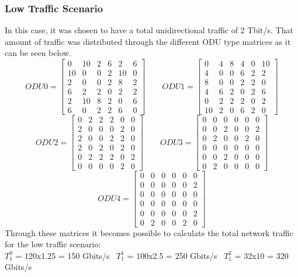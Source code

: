 \subsubsection{Low Traffic Scenario}
\label{low}

In this case, it was chosen to have a total unidirectional traffic of 2 Tbit/s. That amount of traffic was distributed through the different ODU type matrices as it can be seen below. 
\[
ODU0=
  \begin{bmatrix}
    0 & 10 & 2 & 6 & 2 & 6 \\
    10 & 0 & 0 & 2 & 10 & 0 \\
    2 & 0 & 0 & 2 & 8 & 2 \\
    6 & 2 & 2 & 0 & 2 & 2 \\
    2 & 10 & 8 & 2 & 0 & 6 \\
    6 & 0 & 2 & 2 & 6 & 0
  \end{bmatrix}
\qquad ODU1=
  \begin{bmatrix}
    0 & 4 & 8 & 4 & 0 & 10 \\
    4 & 0 & 0 & 6 & 2 & 2 \\
    8 & 0 & 0 & 2 & 2 & 0 \\
    4 & 6 & 2 & 0 & 2 & 6 \\
    0 & 2 & 2 & 2 & 0 & 2 \\
    10 & 2 & 0 & 6 & 2 & 0
  \end{bmatrix}
\]
\[
ODU2=
  \begin{bmatrix}
    0 & 2 & 2 & 2 & 0 & 0 \\
    2 & 0 & 0 & 0 & 2 & 0 \\
    2 & 0 & 0 & 2 & 2 & 0 \\
    2 & 0 & 2 & 0 & 2 & 0 \\
    0 & 2 & 2 & 2 & 0 & 2 \\
    0 & 0 & 0 & 0 & 2 & 0
  \end{bmatrix}
\qquad ODU3=
  \begin{bmatrix}
    0 & 0 & 0 & 0 & 0 & 0 \\
    0 & 0 & 2 & 0 & 0 & 2 \\
    0 & 2 & 0 & 0 & 2 & 0 \\
    0 & 0 & 0 & 0 & 0 & 0 \\
    0 & 0 & 2 & 0 & 0 & 0 \\
    0 & 2 & 0 & 0 & 0 & 0
  \end{bmatrix}
\]
\[
ODU4=
  \begin{bmatrix}
    0 & 0 & 0 & 0 & 0 & 0 \\
    0 & 0 & 0 & 0 & 0 & 2 \\
    0 & 0 & 0 & 0 & 0 & 0 \\
    0 & 0 & 0 & 0 & 0 & 0 \\
    0 & 0 & 0 & 0 & 0 & 2 \\
    0 & 2 & 0 & 0 & 2 & 0
  \end{bmatrix}
\]
Through these matrices it becomes possible to calculate the total network traffic for the low traffic scenario:\\ 
$T_1^0$ = 120x1.25 = 150 Gbits/s \  $T_1^1$ = 100x2.5 = 250 Gbits/s \  $T_1^2$ = 32x10 = 320 Gbits/s \\

